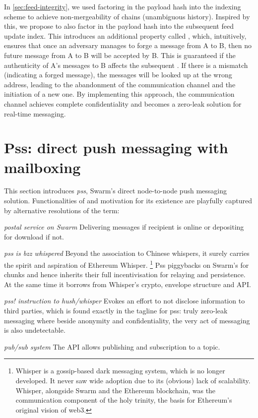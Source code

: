 In \ref{sec:feed-integrity}, we used factoring in the payload hash into the indexing scheme to achieve non-mergeability of chains (unambiguous history). Inspired by this, we propose to also factor in the payload hash into the subsequent feed update index. This introduces an additional property called ,  which, intuitively, ensures that once an adversary manages to forge a message from A to B, then no future message from A to B will be accepted by B.
This is guaranteed if the authenticity of A's  messages to B affects the subsequent . If there is a mismatch (indicating a forged message), the messages will be looked up at the wrong address, leading to the abandonment of the communication channel and the initiation of a new one. By implementing this approach, the communication channel achieves complete confidentiality and becomes a zero-leak solution for real-time messaging.




\section{Pss: direct push messaging with mailboxing \statusgreen}\label{sec:pss}


This section introduces \emph{pss}, Swarm's direct node-to-node push messaging solution. 
Functionalities of and motivation for its existence are playfully captured by alternative resolutions of the term:

\begin{labelledlist}
\item[\emph{postal service on Swarm}] Delivering messages if recipient is online or depositing for download if not.
\item[\emph{pss is bzz whispered}] Beyond the association to Chinese whispers, it surely carries the spirit and aspiration of Ethereum Whisper.%
%
\footnote{Whisper is a gossip-based dark messaging system, which is no longer developed. It never saw wide adoption due to its (obvious) lack of scalability. Whisper, alongside Swarm and the Ethereum blockchain, was the communication component of the holy trinity, the basis for Ethereum's original vision of web3.}
%
Pss piggybacks on Swarm's  for chunks and hence inherits their full incentivisation for relaying and persistence. At the same time it borrows from Whisper's crypto, envelope structure and API.
\item[\emph{pss! instruction to hush/whisper}] Evokes an effort to not disclose information to third parties, which is found exactly in the tagline for pss: truly zero-leak messaging where beside anonymity and confidentiality, the very act of messaging is also undetectable.
\item[\emph{pub/sub system}] The API allows publishing and subscription to a topic.
\end{labelledlist}

